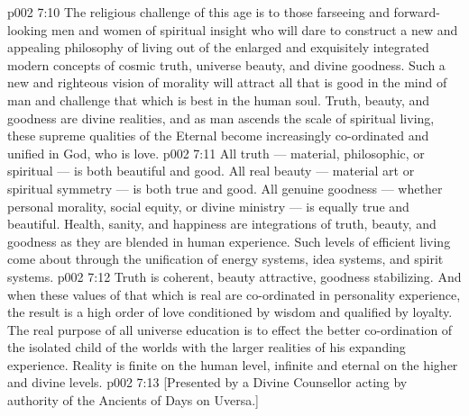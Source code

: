 \vs p002 7:10 The religious challenge of this age is to those farseeing and forward\hyp{}looking men and women of spiritual insight who will dare to construct a new and appealing philosophy of living out of the enlarged and exquisitely integrated modern concepts of cosmic truth, universe beauty, and divine goodness. Such a new and righteous vision of morality will attract all that is good in the mind of man and challenge that which is best in the human soul. Truth, beauty, and goodness are divine realities, and as man ascends the scale of spiritual living, these supreme qualities of the Eternal become increasingly co\hyp{}ordinated and unified in God, who is love.
\vs p002 7:11 \pc All truth --- material, philosophic, or spiritual --- is both beautiful and good. All real beauty --- material art or spiritual symmetry --- is both true and good. All genuine goodness --- whether personal morality, social equity, or divine ministry --- is equally true and beautiful. Health, sanity, and happiness are integrations of truth, beauty, and goodness as they are blended in human experience. Such levels of efficient living come about through the unification of energy systems, idea systems, and spirit systems.
\vs p002 7:12 Truth is coherent, beauty attractive, goodness stabilizing. And when these values of that which is real are co\hyp{}ordinated in personality experience, the result is a high order of love conditioned by wisdom and qualified by loyalty. The real purpose of all universe education is to effect the better co\hyp{}ordination of the isolated child of the worlds with the larger realities of his expanding experience. Reality is finite on the human level, infinite and eternal on the higher and divine levels.
\vsetoff
\vs p002 7:13 [Presented by a Divine Counsellor acting by authority of the Ancients of Days on Uversa.]
\quizlink
